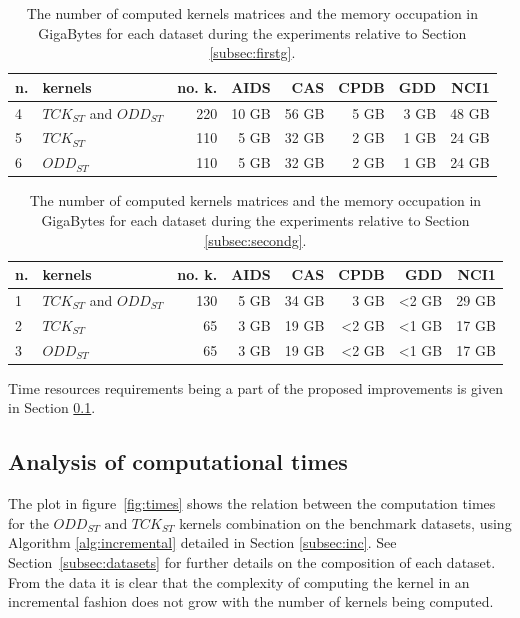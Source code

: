 \begin{table}[ht]
    \centering\footnotesize
    \begin{tabular}{|l|l|r|r|r|r|r|r|}
        \hline
        n. & kernels & no. k. & AIDS & CAS & CPDB & GDD & NCI1 \\
        \hline
        4 & $TCK_{ST}$ and $ODD_{ST}$ & 220 & 10 GB & 56 GB & 5 GB & 3 GB & 48 GB \\
        \hline
        5 & $TCK_{ST}$ & 110 & 5 GB & 32 GB & 2 GB & 1 GB & 24 GB \\
        \hline
        6 & $ODD_{ST}$ & 110 & 5 GB & 32 GB & 2 GB & 1 GB & 24 GB \\
        \hline
    \end{tabular}
    \caption{\footnotesize The number of computed kernels matrices and the memory
    occupation in GigaBytes for each dataset during the experiments relative to
    Section \ref{subsec:firstg}.}
    \label{table:mem1}
\end{table}
\begin{table}[ht]
    \centering\footnotesize
    \begin{tabular}{|l|l|r|r|r|r|r|r|}
        \hline
        n. & kernels & no. k. & AIDS & CAS & CPDB & GDD & NCI1 \\
        \hline
        1 &  $TCK_{ST}$ and $ODD_{ST}$ & 130 & 5 GB & 34 GB & 3 GB & <2 GB & 29 GB \\
        \hline
        2 &  $TCK_{ST}$ & 65 & 3 GB & 19 GB & <2 GB & <1 GB & 17 GB \\
        \hline
        3 & $ODD_{ST}$ & 65 & 3 GB & 19 GB & <2 GB & <1 GB & 17 GB \\
        \hline
    \end{tabular}
    \caption{\footnotesize The number of computed kernels matrices and the memory
    occupation in GigaBytes for each dataset during the experiments relative to
    Section \ref{subsec:secondg}.}
    \label{table:mem2}
\end{table}

Time resources requirements being a part of the proposed improvements is given
in Section \ref{subsec:time_results}.

\subsection{Analysis of computational times}
\label{subsec:time_results}

The plot in figure~\ref{fig:times} shows the relation between the computation times
for the $ODD_{ST}\text{ and }TCK_{ST}$ kernels combination on the benchmark datasets,
using Algorithm \ref{alg:incremental} detailed in Section \ref{subsec:inc}.
See Section~\ref{subsec:datasets} for further details on the composition of each dataset.
From the data it is clear that the complexity of computing the kernel in an incremental
fashion does not grow with the number of kernels being computed.

